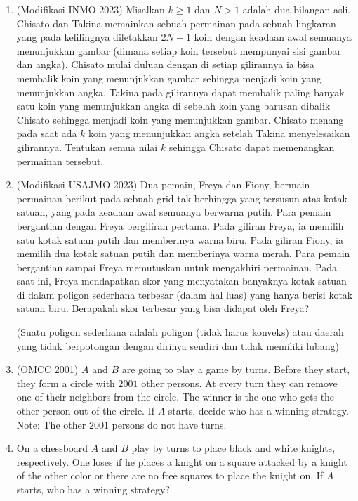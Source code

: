\documentclass[12pt]{scrartcl}
\begin{document}
\begin{enumerate}[resume]
\item
    (Modifikasi INMO 2023) Misalkan $k \ge 1$ dan $N > 1$ adalah dua bilangan asli. Chisato dan Takina memainkan sebuah permainan pada sebuah lingkaran yang pada kelilingnya diletakkan $2N+1$ koin dengan keadaan awal semuanya menunjukkan gambar (dimana setiap koin tersebut mempunyai sisi gambar dan angka). Chisato mulai duluan dengan di setiap gilirannya ia bisa membalik koin yang menunjukkan gambar sehingga menjadi koin yang menunjukkan angka. Takina pada gilirannya dapat membalik paling banyak satu koin yang menunjukkan angka di sebelah koin yang barusan dibalik Chisato sehingga menjadi koin yang menunjukkan gambar. Chisato menang pada saat ada $k$ koin yang menunjukkan angka setelah Takina menyelesaikan gilirannya. Tentukan semua nilai $k$ sehingga Chisato dapat memenangkan permainan tersebut.


\item
(Modifikasi USAJMO 2023) Dua pemain, Freya dan Fiony, bermain permainan berikut pada sebuah grid tak berhingga yang tersusun atas kotak satuan, yang pada keadaan awal semuanya berwarna putih. Para pemain bergantian dengan Freya bergiliran pertama. Pada giliran Freya, ia memilih satu kotak satuan putih dan memberinya warna biru. Pada giliran Fiony, ia memilih dua kotak satuan putih dan memberinya warna merah. Para pemain bergantian sampai Freya memutuskan untuk mengakhiri permainan. Pada saat ini, Freya mendapatkan skor yang menyatakan banyaknya kotak satuan di dalam poligon sederhana terbesar (dalam hal luas) yang hanya berisi kotak satuan biru. Berapakah skor terbesar yang bisa didapat oleh Freya?

(Suatu poligon sederhana adalah poligon (tidak harus konveks) atau daerah yang tidak berpotongan dengan dirinya sendiri dan tidak memiliki lubang)

\item (OMCC 2001) $A$ and $B$ are going to play a game by turns. Before they start, they form a circle with $2001$ other persons. At every turn they can remove one of their neighbors from the circle. The winner is the one who gets the other person out of the circle. If $A$ starts, decide who has a winning strategy. Note: The other $2001$ persons do not have turns.

\item On a chessboard $A$ and $B$ play by turns to place black and white knights, respectively. One loses if he places a knight on a square attacked by a knight of the other color or there are no free squares to place the knight on. If $A$ starts, who has a winning strategy?


\end{enumerate}
\end{document}
